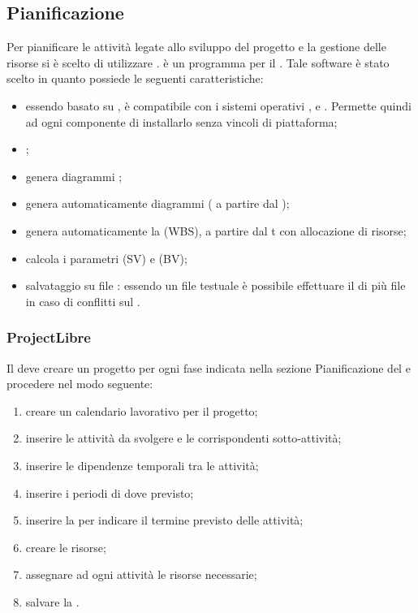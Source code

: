 \documentclass[12pt,a4paper]{article}
\begin{document}
\subsection{Pianificazione}
Per pianificare le attività legate allo sviluppo del progetto e la gestione delle risorse si è scelto di utilizzare .
 è un programma \textit{} per il \textit{}. Tale software è stato scelto in quanto possiede le seguenti caratteristiche:
\begin{itemize}
	\item  essendo basato su , è compatibile con i sistemi operativi , e . Permette quindi ad ogni componente di installarlo senza vincoli di piattaforma; 
	\item {};
	\item genera diagrammi ;
	\item genera automaticamente diagrammi \textit{} ( a partire dal );
	\item genera automaticamente la \textit{} (WBS), a partire dal t con allocazione di risorse;
	\item calcola i parametri \textit{} (SV) e \textit{} (BV);
	\item salvataggio su file : essendo un file testuale è possibile effettuare il  di più file in caso di conflitti sul .
\end{itemize}

\subsubsection{ProjectLibre}
Il \PM deve creare un progetto per ogni fase indicata nella sezione Pianificazione del \PdP{} e procedere nel modo seguente:
\begin{enumerate}
	\item creare un calendario lavorativo per il progetto;
	\item inserire le attività da svolgere e le corrispondenti sotto-attività;
	\item inserire le dipendenze temporali tra le attività;
	\item inserire i periodi di \textit{} dove previsto;
	\item inserire la \textit{} per indicare il termine previsto delle attività;
	\item creare le risorse;
	\item assegnare ad ogni attività le risorse necessarie;
	\item salvare la \textit{}.
\end{enumerate}
\end{document}
